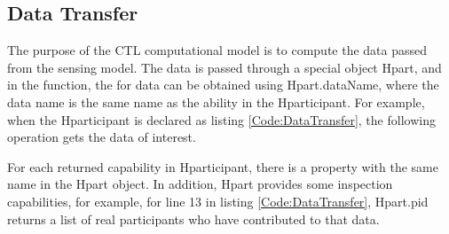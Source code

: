 \subsection{Data Transfer}

The purpose of the CTL computational model is to compute the data passed from the sensing model. The data is passed through a special object {Hpart}, and in the function, the for data can be obtained using {Hpart.dataName}, where the data name is the same name as the ability in the Hparticipant. For example, when the Hparticipant is declared as listing \ref*{Code:DataTransfer}, the following operation gets the data of interest.



For each returned capability in Hparticipant, there is a property with the same name in the Hpart object. In addition, Hpart provides some inspection capabilities, for example, for line 13 in listing \ref{Code:DataTransfer}, Hpart.pid returns a list of real participants who have contributed to that data.

